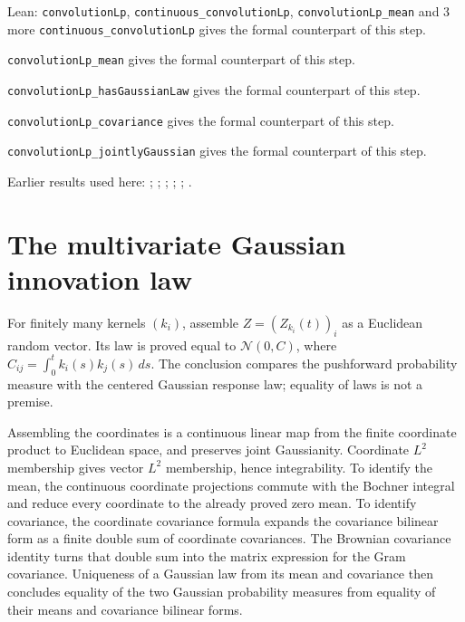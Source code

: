 \documentclass[11pt,a4paper]{article}
\begin{document}
\begin{leanbox}{Lean: \texttt{convolutionLp}, \texttt{continuous\_\allowbreak{}convolutionLp}, \texttt{convolutionLp\_\allowbreak{}mean} and 3 more}
\texttt{continuous\_\allowbreak{}convolution\allowbreak{}Lp} gives the formal counterpart of this step.




\texttt{convolution\allowbreak{}Lp\_\allowbreak{}mean} gives the formal counterpart of this step.




\texttt{convolution\allowbreak{}Lp\_\allowbreak{}has\allowbreak{}Gaussian\allowbreak{}Law} gives the formal counterpart of this step.




\texttt{convolution\allowbreak{}Lp\_\allowbreak{}covariance} gives the formal counterpart of this step.




\texttt{convolution\allowbreak{}Lp\_\allowbreak{}jointly\allowbreak{}Gaussian} gives the formal counterpart of this step.
\end{leanbox}


Earlier results used here: \cite[Section~3.6.12]{LangevinLean2026ULASC}; \cite[Section~3.6.17]{LangevinLean2026ULASC}; \cite[Section~3.6.25]{LangevinLean2026ULASC}; \cite[Section~3.6.26]{LangevinLean2026ULASC}; \cite[Section~3.7.1]{LangevinLean2026ULASC}; \cite[Section~3.8.5]{LangevinLean2026ULASC}.

\section{\texorpdfstring{The multivariate Gaussian innovation law}{The multivariate Gaussian innovation law}}


For finitely many kernels \((k_i)\), assemble \(Z=(Z_{k_i}(t))_i\) as a Euclidean random vector. Its law is proved equal to \(\mathcal N(0,C)\), where \(C_{ij}=\int_0^t k_i(s)k_j(s)\,ds\). The conclusion compares the pushforward probability measure with the centered Gaussian response law; equality of laws is not a premise.



Assembling the coordinates is a continuous linear map from the finite coordinate product to Euclidean space, and preserves joint Gaussianity. Coordinate \(L^{2}\) membership gives vector \(L^{2}\) membership, hence integrability. To identify the mean, the continuous coordinate projections commute with the Bochner integral and reduce every coordinate to the already proved zero mean. To identify covariance, the coordinate covariance formula expands the covariance bilinear form as a finite double sum of coordinate covariances. The Brownian covariance identity turns that double sum into the matrix expression for the Gram covariance. Uniqueness of a Gaussian law from its mean and covariance then concludes equality of the two Gaussian probability measures from equality of their means and covariance bilinear forms.
\end{document}
